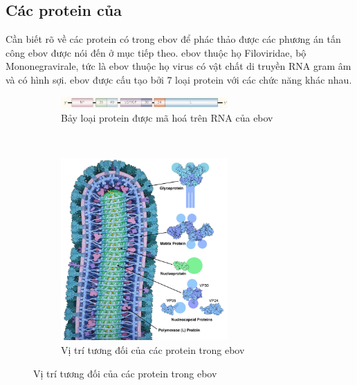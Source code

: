 \documentclass[12pt,a4paper,reqno, oneside]{book}
\begin{document}
\subsection{Các protein của }

	Cần biết rõ về các protein có trong \gls{ebov} để phác thảo được các phương án tấn công \gls{ebov} được nói đến ở mục tiếp theo.
	\Gls{ebov} thuộc họ Filoviridae, bộ Mononegravirale, tức là \gls{ebov} thuộc họ virus có vật chất di truyền RNA gram âm và có hình sợi\cite{Kuhn2010}. \Gls{ebov} được cấu tạo bởi 7 loại protein với các chức năng khác nhau\cite{Huang2002}.
	\begin{figure}[h]
	\centering
	\begin{subfigure}{\textwidth}
	\centering
	\includegraphics[width=0.7\textwidth,natwidth=610,natheight=642]{dsRNA_encode}
	\caption{Bảy loại protein được mã hoá trên RNA của \gls{ebov}}
	\label{fig:encode}
	\end{subfigure}\\
	\begin{subfigure}{\textwidth}
	\centering
	\includegraphics[width=0.7\textwidth,natwidth=610,natheight=642]{virion}
	\caption{Vị trí tương đối của các protein trong \gls{ebov}}
	\label{fig:ebola_proteins}
	\end{subfigure}
	\end{figure}
\end{document}
